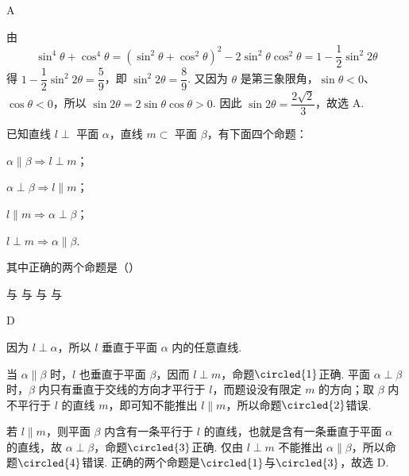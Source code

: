 \documentclass[UTF8,a4paper,oneside,11pt]{ctexbook}
\begin{document}
\begin{answer}
A
\end{answer}

\begin{solution}
由
\[
\sin^4\theta+\cos^4\theta
=\left(\sin^2\theta+\cos^2\theta\right)^2-2\sin^2\theta\cos^2\theta
=1-\frac12\sin^2 2\theta
\]
得 \(1-\dfrac12\sin^2 2\theta=\dfrac59\)，即 \(\sin^2 2\theta=\dfrac89\). 又因为 \(\theta\) 是第三象限角，\(\sin\theta<0\)、\(\cos\theta<0\)，所以 \(\sin2\theta=2\sin\theta\cos\theta>0\). 因此 \(\sin2\theta=\dfrac{2\sqrt2}{3}\)，故选 A.
\end{solution}

\begin{problem}
已知直线 \(l \perp\) 平面 \(\alpha\)，直线 \(m \subset\) 平面 \(\beta\)，有下面四个命题：

\begin{circlelist}
\item \(\alpha \parallel \beta \Rightarrow l \perp m\)；
\item \(\alpha \perp \beta \Rightarrow l \parallel m\)；
\item \(l \parallel m \Rightarrow \alpha \perp \beta\)；
\item \(l \perp m \Rightarrow \alpha \parallel \beta\).
\end{circlelist}

其中正确的两个命题是（\quad）

\choices
    {与}
    {与}
    {与}
    {与}
\end{problem}

\begin{answer}
D
\end{answer}

\begin{solution}
因为 \(l\perp\alpha\)，所以 \(l\) 垂直于平面 \(\alpha\) 内的任意直线.

当 \(\alpha\parallel\beta\) 时，\(l\) 也垂直于平面 \(\beta\)，因而 \(l\perp m\)，命题\(\circled{1}\)正确. 平面 \(\alpha\perp\beta\) 时，\(\beta\) 内只有垂直于交线的方向才平行于 \(l\)，而题设没有限定 \(m\) 的方向；取 \(\beta\) 内不平行于 \(l\) 的直线 \(m\)，即可知不能推出 \(l\parallel m\)，所以命题\(\circled{2}\)错误.

若 \(l\parallel m\)，则平面 \(\beta\) 内含有一条平行于 \(l\) 的直线，也就是含有一条垂直于平面 \(\alpha\) 的直线，故 \(\alpha\perp\beta\)，命题\(\circled{3}\)正确. 仅由 \(l\perp m\) 不能推出 \(\alpha\parallel\beta\)，所以命题\(\circled{4}\)错误. 正确的两个命题是\(\circled{1}\)与\(\circled{3}\)，故选 D.
\end{solution}
\end{document}
